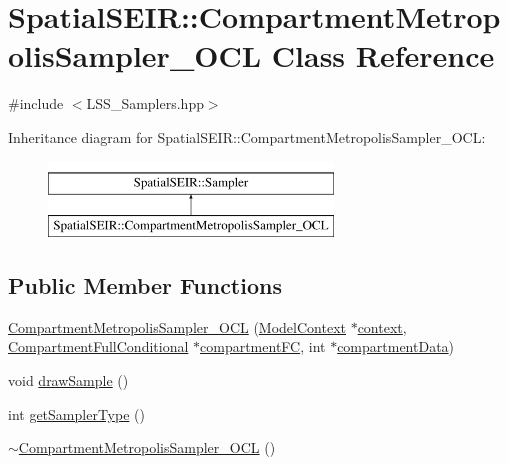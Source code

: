 \hypertarget{classSpatialSEIR_1_1CompartmentMetropolisSampler__OCL}{\section{Spatial\-S\-E\-I\-R\-:\-:Compartment\-Metropolis\-Sampler\-\_\-\-O\-C\-L Class Reference}
\label{classSpatialSEIR_1_1CompartmentMetropolisSampler__OCL}
}


{\ttfamily \#include $<$L\-S\-S\-\_\-\-Samplers.\-hpp$>$}

Inheritance diagram for Spatial\-S\-E\-I\-R\-:\-:Compartment\-Metropolis\-Sampler\-\_\-\-O\-C\-L\-:\begin{figure}[H]
\begin{center}
\leavevmode
\includegraphics[height=2.000000cm]{classSpatialSEIR_1_1CompartmentMetropolisSampler__OCL}
\end{center}
\end{figure}
\subsection*{Public Member Functions}
\begin{DoxyCompactItemize}
\item 
\hyperlink{classSpatialSEIR_1_1CompartmentMetropolisSampler__OCL_a02fa309e6095b0450252d449fa71dc19}{Compartment\-Metropolis\-Sampler\-\_\-\-O\-C\-L} (\hyperlink{classSpatialSEIR_1_1ModelContext}{Model\-Context} $\ast$\hyperlink{classSpatialSEIR_1_1CompartmentMetropolisSampler__OCL_a231d67f96a0b9e2834b600804f1b06a1}{context}, \hyperlink{classSpatialSEIR_1_1CompartmentFullConditional}{Compartment\-Full\-Conditional} $\ast$\hyperlink{classSpatialSEIR_1_1CompartmentMetropolisSampler__OCL_a794de19e975d79673a8c7b9c952ce075}{compartment\-F\-C}, int $\ast$\hyperlink{classSpatialSEIR_1_1CompartmentMetropolisSampler__OCL_a4bcbbab42aac73ed628addf8d7a93526}{compartment\-Data})
\item 
void \hyperlink{classSpatialSEIR_1_1CompartmentMetropolisSampler__OCL_a7a0a9120eab5a44797f9255df6f89c2a}{draw\-Sample} ()
\item 
int \hyperlink{classSpatialSEIR_1_1CompartmentMetropolisSampler__OCL_a15b18cebae437f578fbf15aa8cfbdf94}{get\-Sampler\-Type} ()
\item 
\hyperlink{classSpatialSEIR_1_1CompartmentMetropolisSampler__OCL_ad3ca68f1d4d230fb3c9af13ee317832a}{$\sim$\-Compartment\-Metropolis\-Sampler\-\_\-\-O\-C\-L} ()
\end{DoxyCompactItemize}
